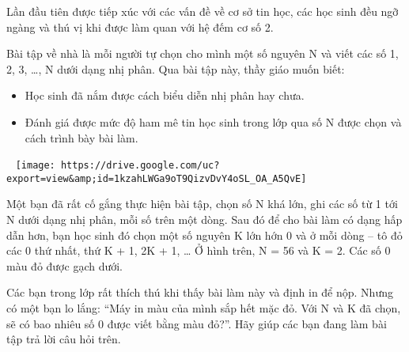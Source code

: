 Lần đầu tiên được tiếp xúc với các vấn đề về cơ sở tin học, các học sinh đều ngỡ ngàng và thú vị khi được làm quan với hệ đếm cơ số 2.

Bài tập về nhà là mỗi người tự chọn cho mình một số nguyên N và viết các số 1, 2, 3, …, N dưới dạng nhị phân. Qua bài tập này, thầy giáo muốn biết:
\begin{itemize}
	\item Học sinh đã nắm được cách biểu diễn nhị phân hay chưa.
	\item Đánh giá được mức độ ham mê tin học sinh trong lớp qua số N được chọn và cách trình bày bài làm.
\end{itemize}

 
\texttt{[image: https://drive.google.com/uc?export=view\&amp;id=1kzahLWGa9oT9QizvDvY4oSL\_OA\_A5QvE]}

Một bạn đã rất cố gắng thực hiện bài tập, chọn số N khá lớn, ghi các số từ 1 tới N dưới dạng nhị phân, mỗi số trên một dòng. Sau đó để cho bài làm có dạng hấp dẫn hơn, bạn học sinh đó chọn một số nguyên K lớn hớn 0 và ở mỗi dòng – tô đỏ các 0 thứ nhất, thứ K + 1, 2K + 1, … Ở hình trên, N = 56 và K = 2. Các số 0 màu đỏ được gạch dưới.

Các bạn trong lớp rất thích thú khi thấy bài làm này và định in để nộp. Nhưng có một bạn lo lắng: “Máy in màu của mình sắp hết mặc đỏ. Với N và K đã chọn, sẽ có bao nhiêu số 0 được viết bằng màu đỏ?”. Hãy giúp các bạn đang làm bài tập trả lời câu hỏi trên.